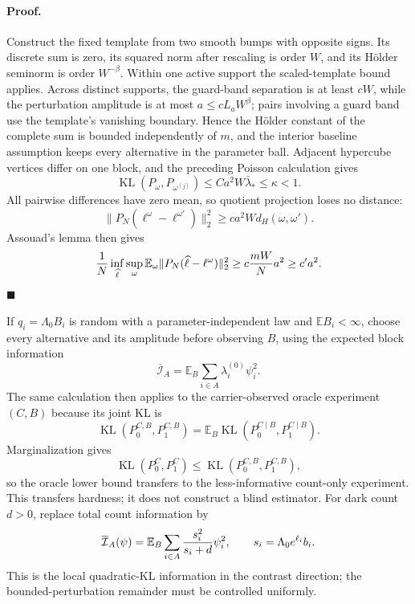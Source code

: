 \paragraph{Proof.}
Construct the fixed template from two smooth bumps with opposite signs.
Its discrete sum is zero, its squared norm after rescaling is order $W$,
and its H\"older seminorm is order $W^{-\beta}$.  Within one active
support the scaled-template bound applies.  Across distinct supports,
the guard-band separation is at least $cW$, while the perturbation
amplitude is at most $a\le cL_aW^\beta$; pairs involving a guard band
use the template's vanishing boundary.  Hence the H\"older constant of
the complete sum is bounded independently of $m$, and the interior
baseline assumption keeps every alternative in the parameter ball.
Adjacent hypercube
vertices differ on one block, and the preceding Poisson calculation
gives
\[
 \operatorname{KL}(P_\omega,P_{\omega^{(j)}})
 \le Ca^2W\bar\lambda_*\le\kappa<1.
\]
All pairwise differences have zero mean, so quotient projection loses
no distance:
\[
 \|P_N(\ell^\omega-\ell^{\omega'})\|_2^2
 \ge ca^2W d_H(\omega,\omega').
\]
Assouad's lemma then gives
\[
 {1\over N}\inf_{\widehat\ell}\sup_\omega
 \mathbb E_\omega\|P_N(\widehat\ell-\ell^\omega)\|_2^2
 \ge c{mW\over N}a^2\ge c'a^2.
\]
\hfill$\blacksquare$

If $q_i=\Lambda_0B_i$ is random with a parameter-independent law and
$\mathbb EB_i<\infty$, choose every alternative and its amplitude
before observing $B$, using the expected block information
\[
 \overline{\mathcal I}_A
 =\mathbb E_B\sum_{i\in A}\lambda_i^{(0)}\psi_i^2.
\]
The same calculation then applies to the carrier-observed oracle
experiment $(C,B)$ because its joint KL is
\[
 \operatorname{KL}(P_0^{C,B},P_1^{C,B})
 =\mathbb E_B\operatorname{KL}
   (P_0^{C\mid B},P_1^{C\mid B}).
\]
Marginalization gives
\[
 \operatorname{KL}(P_0^C,P_1^C)
 \le\operatorname{KL}(P_0^{C,B},P_1^{C,B}),
\]
so the oracle lower bound transfers to the less-informative count-only
experiment.  This transfers hardness; it does not construct a blind
estimator.  For dark count $d>0$, replace total count information by
\[
 \overline{\mathcal I}_A(\psi)
 =\mathbb E_B\sum_{i\in A}{s_i^2\over s_i+d}\psi_i^2,
 \qquad s_i=\Lambda_0e^{\ell_i}b_i.
\]
This is the local quadratic-KL information in the contrast direction;
the bounded-perturbation remainder must be controlled uniformly.

